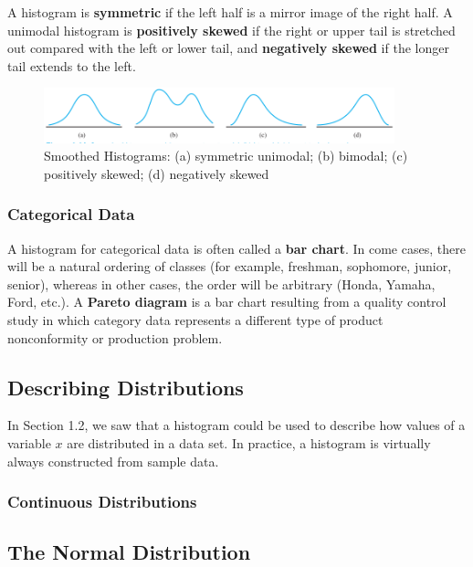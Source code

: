 \documentclass{article}
\begin{document}
		A histogram is \textbf{symmetric} if the left half is a mirror image of the right half. A 
		unimodal histogram is \textbf{positively skewed} if the right or upper tail is stretched out 
		compared with the left or lower tail, and \textbf{negatively skewed} if the longer tail extends 
		to the left.
		
		\begin{figure}[!htb]
		   \centering
		   \includegraphics[width=4in]{histograms.jpg} 
		   \caption{Smoothed Histograms: (a) symmetric unimodal; (b) bimodal; (c) positively 
		   	skewed; (d) negatively skewed}
		   \label{fig:histograms}
		\end{figure}	
		
		\subsubsection{Categorical Data}
		A histogram for categorical data is often called a \textbf{bar chart}. In come cases, there 
		will be a natural ordering of classes (for example, freshman, sophomore, junior, senior), 
		whereas in other cases, the order will be arbitrary (Honda, Yamaha, Ford, etc.). A 
		\textbf{Pareto diagram} is a bar chart resulting from a quality control study in which 
		category data represents a different type of product nonconformity or production problem.
	
	\subsection{Describing Distributions} %
	In Section 1.2, we saw that a histogram could be used to describe how values of a variable $x$ 
	are distributed in a data set. In practice, a histogram is virtually always constructed from sample 
	data.
	
		\subsubsection{Continuous Distributions}
		
	
	\subsection{The Normal Distribution} %
	
\end{document}
